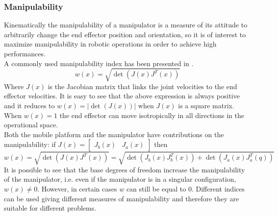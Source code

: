\subsubsection{Manipulability} 
Kinematically the manipulability of a manipulator is a measure of its attitude to arbitrarily change the end effector position and orientation, so it is of interest to maximize manipulability in robotic operations in order to achieve high performances.\\
A commonly used manipulability index has been presented in \cite{yoshikawa1983} \cite{yoshikawa1985}.
\begin{equation}
w(x) = \sqrt{\det\left(J(x)J^T(x)\right)}
\end{equation}
Where $J(x)$ is the Jacobian matrix that links the joint velocities to the end effector velocities. It is easy to see that the above expression is always positive and it reduces to $w(x)=\left| \det\left(J(x)\right)\right| $ when $J(x)$ is a square matrix. When $w(x)=1$ the end effector can move isotropically in all directions in the operational space.\\
Both the mobile platform and the manipulator have contributions on the manipulability: if $J(x)=\left[\begin{matrix}J_b(x)&J_a(x)\end{matrix}\right]$ then
\begin{equation}
w(x) = \sqrt{\det\left(J(x)J^T(x)\right)}=\sqrt{\det\left(J_b(x)J_b^T(x)\right)+\det\left(J_a(x)J_a^T(q)\right)}
\end{equation}
It is possible to see that the base degrees of freedom increase the manipulability of the manipulator, i.e. even if the manipulator is in a singular configuration, $w(x)\neq0$. However, in certain cases $w$ can still be equal to 0. Different indices can be used giving different measures of manipulability and therefore they are suitable for different problems.

